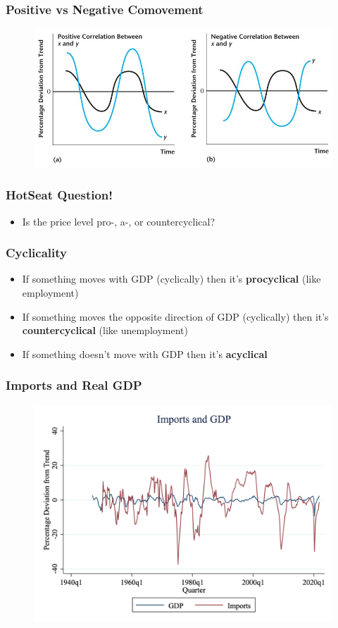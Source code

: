 \documentclass{beamer}
\begin{document}
\begin{frame}
\frametitle[alignment=center]{Positive vs Negative Comovement}
\begin{figure}
\centering
\includegraphics[scale=0.5]{Figures/W_Fig_3pt3.png}
\end{figure}
\end{frame}

\begin{frame}
\frametitle[alignment=center]{HotSeat Question!}
\begin{itemize}
\item Is the price level pro-, a-, or countercyclical?
\end{itemize}
\end{frame}


\begin{frame}
\frametitle[alignment=center]{Cyclicality}
\begin{itemize}
\item If something moves with GDP (cyclically) then it's \textbf{procyclical} (like employment)
\item If something moves the opposite direction of GDP (cyclically) then it's \textbf{countercyclical} (like unemployment)
\item If something doesn't move with GDP then it's \textbf{acyclical} 
\end{itemize}
\end{frame}


\begin{frame}
\frametitle[alignment=center]{Imports and Real GDP}
\begin{figure}
\centering
\includegraphics[scale=0.25]{Figures/Fig_3pt5.png}
\end{figure}
\end{frame}
\end{document}
